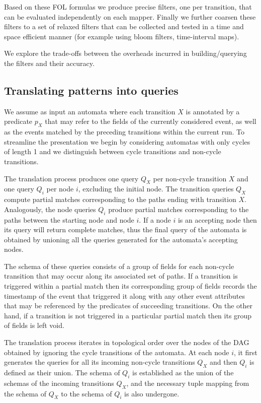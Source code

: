 Based on these FOL formulas we produce precise filters, one per transition, 
that can be evaluated independently on each mapper.
Finally we further coarsen these filters to a set of relaxed filters
that can be collected and tested in a time and space efficient manner (for
example using bloom filters, time-interval maps).

We explore the trade-offs between the overheads incurred in building/querying
the filters and their accuracy. 


\subsection{Translating patterns into queries}

We assume as input an automata where each transition $X$ is annotated by a
predicate $p_X$ that may refer to the fields of the currently considered event,
as well as the events matched by the preceding transitions within the current
run.
To streamline the presentation we begin by considering automatas with only
cycles of length 1 and we distinguish between cycle transitions and
non-cycle transitions.


The translation process produces one query $Q_X$ per non-cycle transition $X$
and one query $Q_i$ per node $i$, excluding the initial node.
The transition queries $Q_X$ compute partial matches corresponding to the paths
ending with transition $X$.
Analogously, the node queries $Q_i$ produce partial matches corresponding to the
paths between the starting node and node $i$.
If a node $i$ is an accepting node then its query will return complete matches,
thus the final query of the automata is obtained by unioning all the queries
generated for the automata's accepting nodes.


The schema of these queries consists of a group of fields for each non-cycle
transition that may occur along its associated set of paths. If a transition is
triggered within a partial match then its corresponding group of fields records
the timestamp of the event that triggered it along with any other event
attributes that may be referenced by the predicates of succeeding transitions.
On the other hand, if a transition is not triggered in a particular partial
match then its group of fields is left void.


The translation process iterates in topological order over the nodes of the DAG
obtained by ignoring the cycle transitions of the automata.
At each node $i$, it first generates the queries for all its incoming
non-cycle transitions $Q_X$ and then $Q_i$ is defined as their union. 
The schema of $Q_i$ is established as the
union of the schemas of the incoming transitions $Q_X$, and the necessary tuple
mapping from the schema of $Q_X$ to the schema of $Q_i$ is also undergone.

